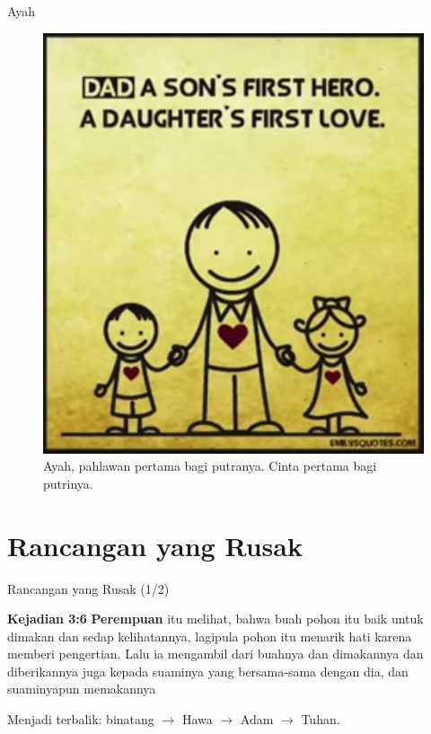 \documentclass{beamer}
\theoremstyle{mystyle}
\begin{document}
\begin{frame}{Ayah}
	\begin{figure}[!ht]
	\centering
	\includegraphics[scale=.3]{images/ayah-cinta-pertama}
	\caption{Ayah, pahlawan pertama bagi putranya. Cinta pertama bagi putrinya.}
\end{figure}	
\end{frame}

\section{Rancangan yang Rusak}
\begin{frame}{Rancangan yang Rusak (1/2)}
	\begin{block}{\textbf{Kejadian 3:6}}
		\textbf{Perempuan} itu melihat, bahwa buah pohon itu baik untuk dimakan dan sedap kelihatannya, lagipula pohon itu menarik hati karena memberi pengertian. Lalu ia mengambil dari buahnya dan dimakannya dan diberikannya juga kepada suaminya yang bersama-sama dengan dia, dan suaminyapun memakannya
	\end{block}

	\bigskip
	Menjadi terbalik: binatang $\longrightarrow$ Hawa $\longrightarrow$ Adam $\longrightarrow$ Tuhan.
\end{frame}
\end{document}
